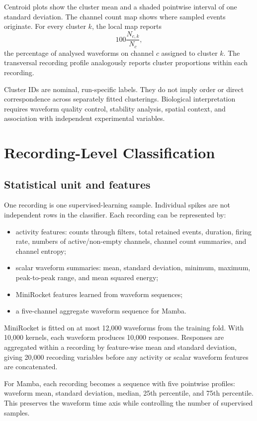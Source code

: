 \documentclass[11pt,a4paper]{article}
\begin{document}
Centroid plots show the cluster mean and a shaded pointwise interval of one
standard deviation. The channel count map shows where sampled events originate.
For every cluster \(k\), the local map reports
\[
  100\frac{N_{c,k}}{N_c},
\]
the percentage of analysed waveforms on channel \(c\) assigned to cluster
\(k\). The transversal recording profile analogously reports cluster
proportions within each recording.

Cluster IDs are nominal, run-specific labels. They do not imply order or direct
correspondence across separately fitted clusterings. Biological interpretation
requires waveform quality control, stability analysis, spatial context, and
association with independent experimental variables.

\section{Recording-Level Classification}

\subsection{Statistical unit and features}

One recording is one supervised-learning sample. Individual spikes are not
independent rows in the classifier. Each recording can be represented by:

\begin{itemize}
  \item activity features: counts through filters, total retained events,
  duration, firing rate, numbers of active/non-empty channels, channel count
  summaries, and channel entropy;
  \item scalar waveform summaries: mean, standard deviation, minimum, maximum,
  peak-to-peak range, and mean squared energy;
  \item MiniRocket features learned from waveform sequences;
  \item a five-channel aggregate waveform sequence for Mamba.
\end{itemize}

MiniRocket is fitted on at most 12,000 waveforms from the training fold. With
10,000 kernels, each waveform produces 10,000 responses. Responses are
aggregated within a recording by feature-wise mean and standard deviation,
giving 20,000 recording variables before any activity or scalar waveform
features are concatenated.

For Mamba, each recording becomes a sequence with five pointwise profiles:
waveform mean, standard deviation, median, 25th percentile, and 75th percentile.
This preserves the waveform time axis while controlling the number of supervised
samples.
\end{document}
